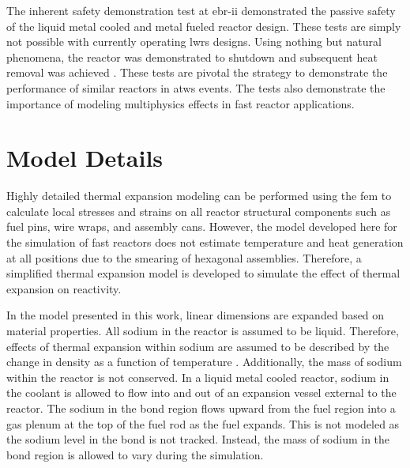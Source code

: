   The inherent safety demonstration test at \gls{ebr-ii} demonstrated the
  passive safety of the liquid metal cooled and metal fueled reactor design.
  These tests are simply not possible with currently operating \glspl{lwr}
  designs. Using nothing but natural phenomena, the reactor was demonstrated to
  shutdown and subsequent heat removal was achieved \cite{ebriitests}. These
  tests are pivotal the strategy to demonstrate the performance of similar
  reactors in \gls{atws} events. The tests also demonstrate the importance of 
  modeling multiphysics effects in fast reactor applications.

\section{Model Details}
  \label{sec:model_details}
  Highly detailed thermal expansion modeling can be performed using the
  \gls{fem} to calculate local stresses and strains on all reactor
  structural components such as fuel pins, wire wraps, and assembly cans. 
  However, the model developed here for the simulation of
  fast reactors does not estimate temperature and heat generation at all 
  positions due to the smearing of hexagonal assemblies. Therefore, a simplified 
  thermal expansion model is developed to simulate the effect of thermal 
  expansion on reactivity.

  In the model presented in this work, linear dimensions are expanded based on
  material properties. All sodium in the reactor is assumed to be liquid.
  Therefore, effects of thermal expansion within sodium are assumed to be
  described by the change in density as a function of temperature
  \cite{sodiumProp}. Additionally, the mass of sodium within the reactor is not
  conserved. In a liquid metal cooled reactor, sodium in the coolant is allowed
  to flow into and out of an expansion vessel external to the reactor. The
  sodium in the bond region flows upward from the fuel region into a gas plenum
  at the top of the fuel rod as the fuel expands. This is not modeled as the
  sodium level in the bond is not tracked. Instead, the mass of sodium in the
  bond region is allowed to vary during the simulation.

